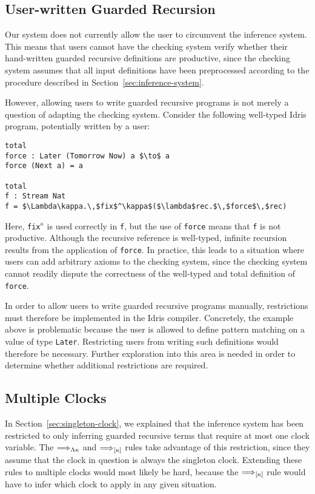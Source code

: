 \subsection{User-written Guarded Recursion}
\label{sec:user-written-guarded}
Our system does not currently allow the user to circumvent the inference
system. This means that users cannot have the checking system verify whether
their hand-written guarded recursive definitions are productive, since the
checking system assumes that all input definitions have been preprocessed
according to the procedure described in Section~\ref{sec:inference-system}.

However, allowing users to write guarded recursive programs is not merely a
question of adapting the checking system. Consider the following well-typed
Idris program, potentially written by a user:
\begin{lstlisting}[mathescape, title=\idrisBlock]
total 
force : Later (Tomorrow Now) a $\to$ a
force (Next a) = a

total 
f : Stream Nat
f = $\Lambda\kappa.\,$fix$^\kappa$($\lambda$rec.$\,$force$\,$rec)
\end{lstlisting}
Here, \texttt{fix$^\kappa$} is used correctly in \texttt{f}, but the use of
\texttt{force} means that \texttt{f} is not productive. Although the recursive
reference is well-typed, infinite recursion results from the application of
\texttt{force}. In practice, this leads to a situation where users can add
arbitrary axioms to the checking system, since the checking system cannot
readily dispute the correctness of the well-typed and total definition of
\texttt{force}.

In order to allow users to write guarded recursive programs manually,
restrictions must therefore be implemented in the Idris compiler. Concretely,
the example above is problematic because the user is allowed to define pattern
matching on a value of type \texttt{Later}. Restricting users from writing such
definitions would therefore be necessary. Further exploration into this area is
needed in order to determine whether additional restrictions are required.

\subsection{Multiple Clocks}
\label{sec:multiple-clocks}
In Section~\ref{sec:singleton-clock}, we explained that the inference system has
been restricted to only inferring guarded recursive terms that require at most
one clock variable. The $\Longrightarrow_{\Lambda\kappa}$ and $\Longrightarrow_{[\kappa]}$ rules
take advantage of this restriction, since they assume that the clock in question
is always the singleton clock. Extending these rules to multiple clocks would
most likely be hard, because the $\Longrightarrow_{[\kappa]}$ rule would have to infer
which clock to apply in any given situation.

